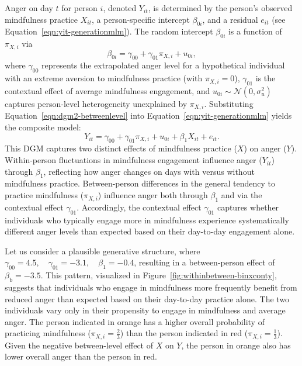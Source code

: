 \documentclass[stu]{apa7}
\begin{document}
Anger on day \( t \) for person \( i \), denoted \( Y_{it} \), is determined by the person’s observed mindfulness practice \( X_{it} \), a person-specific intercept \( \beta_{0i} \), and a residual \( e_{it} \) (see Equation~\ref{eqn:yit-generationmlm}). The random intercept \( \beta_{0i} \) is a function of \( \pi_{X,i} \) via
\begin{equation}
    \label{eqn:dgm2-betweenlevel}
    \beta_{0i} = \gamma_{00} + \gamma_{01} \pi_{X,i} + u_{0i},
\end{equation}
where $\gamma_{00}$ represents the extrapolated anger level for a hypothetical individual with an extreme aversion to mindfulness practice (with $\pi_{X,i} = 0$), \( \gamma_{01} \) is the contextual effect of average mindfulness engagement, and \( u_{0i} \sim \mathcal{N}(0, \sigma^2_u) \) captures person-level heterogeneity unexplained by \( \pi_{X,i} \). Substituting Equation~\ref{eqn:dgm2-betweenlevel} into Equation~\ref{eqn:yit-generationmlm} yields the composite model:
\begin{equation}
    Y_{it} = \gamma_{00} + \gamma_{01} \pi_{X,i} + u_{0i} + \beta_1 X_{it} + e_{it}.
\end{equation}
This DGM captures two distinct effects of mindfulness practice (\( X \)) on anger (\( Y \)). Within-person fluctuations in mindfulness engagement influence anger (\( Y_{it} \)) through \( \beta_1 \), reflecting how anger changes on days with versus without mindfulness practice. Between-person differences in the general tendency to practice mindfulness (\( \pi_{X,i} \)) influence anger both through \( \beta_1 \) and via the contextual effect \( \gamma_{01} \). Accordingly, the contextual effect \( \gamma_{01} \) captures whether individuals who typically engage more in mindfulness experience systematically different anger levels than expected based on their day-to-day engagement alone. 

Let us consider a plausible generative structure, where \( \gamma_{00} = 4.5, \quad \gamma_{01} = -3.1, \quad \beta_1 = -0.4 \), resulting in a between-person effect of \( \beta_\text{b} = -3.5 \). This pattern, visualized in Figure~\ref{fig:withinbetween-binxconty}, suggests that individuals who engage in mindfulness more frequently benefit from reduced anger than expected based on their day-to-day practice alone. The two individuals vary only in their propensity to engage in mindfulness and average anger. The person indicated in orange has a higher overall probability of practicing mindfulness (\( \pi_{X,i} = \frac{2}{3} \)) than the person indicated in red (\( \pi_{X,i} = \frac{1}{3} \)). Given the negative between-level effect of \( X \) on \( Y \), the person in orange also has lower overall anger than the person in red.
\end{document}
